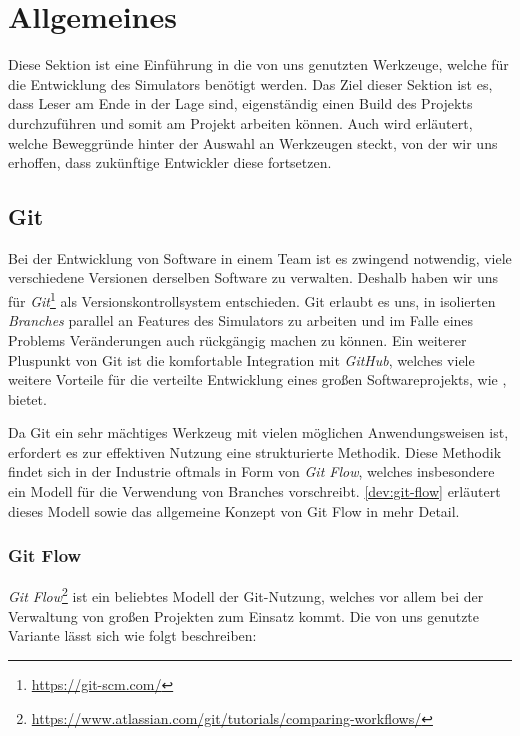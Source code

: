
\section{Allgemeines}
\label{dev:general}

Diese Sektion ist eine Einführung in die von uns genutzten Werkzeuge, welche für
die Entwicklung des Simulators benötigt werden. Das Ziel dieser Sektion ist es,
dass Leser am Ende in der Lage sind, eigenständig einen Build des Projekts
durchzuführen und somit am Projekt arbeiten können. Auch wird erläutert, welche
Beweggründe hinter der Auswahl an Werkzeugen steckt, von der wir uns erhoffen,
dass zukünftige Entwickler diese fortsetzen.

\subsection{Git}

Bei der Entwicklung von Software in einem Team ist es zwingend notwendig, viele
verschiedene Versionen derselben Software zu verwalten. Deshalb haben wir uns
für \emph{Git}\footnote{\url{https://git-scm.com/}} als Versionskontrollsystem
entschieden. Git erlaubt es uns, in isolierten \emph{Branches} parallel an
Features des Simulators zu arbeiten und im Falle eines Problems Veränderungen
auch rückgängig machen zu können. Ein weiterer Pluspunkt von Git ist die
komfortable Integration mit \emph{GitHub}, welches viele weitere Vorteile für
die verteilte Entwicklung eines großen Softwareprojekts, wie \erasim{}, bietet.

Da Git ein sehr mächtiges Werkzeug mit vielen möglichen Anwendungsweisen ist,
erfordert es zur effektiven Nutzung eine strukturierte Methodik. Diese Methodik
findet sich in der Industrie oftmals in Form von \emph{Git Flow}, welches
insbesondere ein Modell für die Verwendung von Branches vorschreibt.
\autoref{dev:git-flow} erläutert dieses Modell sowie das allgemeine Konzept von
Git Flow in mehr Detail.

\subsubsection{Git Flow}
\label{dev:git-flow}

\emph{Git
Flow}\footnote{\url{https://www.atlassian.com/git/tutorials/comparing-workflows/}}
ist ein beliebtes Modell der Git-Nutzung, welches vor allem bei der Verwaltung
von großen Projekten zum Einsatz kommt. Die von uns genutzte Variante lässt sich
wie folgt beschreiben:

